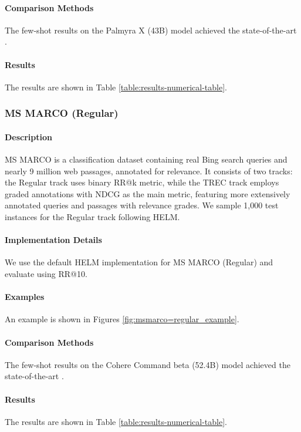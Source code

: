 \paragraph{Comparison Methods}
The few-shot results on the Palmyra X (43B) model achieved the state-of-the-art \citep{liang2022holistic}.

\paragraph{Results} The results are shown in Table \ref{table:results-numerical-table}.

\subsubsection{MS MARCO (Regular)}
\label{appendix:ms-marco}

\paragraph{Description} MS MARCO \citep{bajaj2018ms, nogueira2020document, MacAvaney_2021} is a classification dataset containing real Bing search queries and nearly 9 million web passages, annotated for relevance. It consists of two tracks: the Regular track uses binary RR@k metric, while the TREC track employs graded annotations with NDCG as the main metric, featuring more extensively annotated queries and passages with relevance grades. We sample 1,000 test instances for the Regular track following HELM.

\paragraph{Implementation Details}
We use the default HELM implementation for MS MARCO (Regular) and evaluate using RR@10.  

\paragraph{Examples} An example is shown in Figures \ref{fig:msmarco=regular_example}.

\paragraph{Comparison Methods}
The few-shot results on the Cohere Command beta (52.4B) model achieved the state-of-the-art \citep{liang2022holistic}.

\paragraph{Results} The results are shown in Table \ref{table:results-numerical-table}.

